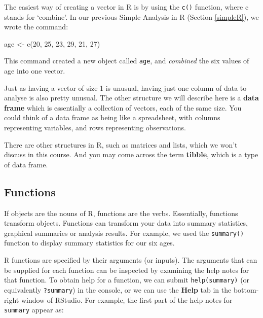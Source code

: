 \documentclass[
]{memoir}
\newenvironment{Shaded}{\begin{snugshade}}{\end{snugshade}}
\newcommand{\DecValTok}[1]{\textcolor[rgb]{0.00,0.00,0.81}{#1}}
\newcommand{\FunctionTok}[1]{\textcolor[rgb]{0.00,0.00,0.00}{#1}}
\newcommand{\NormalTok}[1]{#1}
\newcommand{\OtherTok}[1]{\textcolor[rgb]{0.56,0.35,0.01}{#1}}
\begin{document}
The easiest way of creating a vector in R is by using the \texttt{c()} function, where c stands for `combine'. In our previous Simple Analysis in R (Section \ref{simpleR}), we wrote the command:

\begin{Shaded}
\begin{Highlighting}[]
\NormalTok{age }\OtherTok{\textless{}{-}} \FunctionTok{c}\NormalTok{(}\DecValTok{20}\NormalTok{, }\DecValTok{25}\NormalTok{, }\DecValTok{23}\NormalTok{, }\DecValTok{29}\NormalTok{, }\DecValTok{21}\NormalTok{, }\DecValTok{27}\NormalTok{)}
\end{Highlighting}
\end{Shaded}

This command created a new object called \texttt{age}, and \emph{combined} the six values of age into one vector.

Just as having a vector of size 1 is unusual, having just one column of data to analyse is also pretty unusual. The other structure we will describe here is a \textbf{data frame} which is essentially a collection of vectors, each of the same size. You could think of a data frame as being like a spreadsheet, with columns representing variables, and rows representing observations.

There are other structures in R, such as matrices and lists, which we won't discuss in this course. And you may come across the term \textbf{tibble}, which is a type of data frame.

\hypertarget{functions}{%
\subsection{Functions}\label{functions}}

If objects are the nouns of R, functions are the verbs. Essentially, functions transform objects. Functions can transform your data into summary statistics, graphical summaries or analysis results. For example, we used the \texttt{summary()} function to display summary statistics for our six ages.

R functions are specified by their arguments (or inputs). The arguments that can be supplied for each function can be inspected by examining the help notes for that function. To obtain help for a function, we can submit \texttt{help(summary)} (or equivalently \texttt{?summary}) in the console, or we can use the \textbf{Help} tab in the bottom-right window of RStudio. For example, the first part of the help notes for \texttt{summary} appear as:
\end{document}
